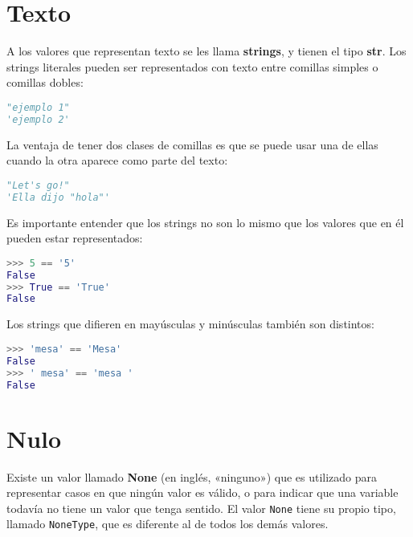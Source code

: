 \section{Texto}

A los valores que representan texto se les llama \textbf{strings}, y
tienen el tipo \textbf{str}.
Los strings literales pueden ser representados con texto entre comillas
simples o comillas dobles:

\begin{lstlisting}[language=py]
"ejemplo 1"
'ejemplo 2'
\end{lstlisting}

La ventaja de tener dos clases de comillas es que se puede usar una de
ellas cuando la otra aparece como parte del texto:

\begin{lstlisting}[language=py]
"Let's go!"
'Ella dijo "hola"'
\end{lstlisting}

Es importante entender que los strings no son lo mismo que los valores
que en él pueden estar representados:

\begin{lstlisting}[language=py]
>>> 5 == '5'
False
>>> True == 'True'
False
\end{lstlisting}

Los strings que difieren en mayúsculas y minúsculas
también son distintos:

\begin{lstlisting}[language=py]
>>> 'mesa' == 'Mesa'
False
>>> ' mesa' == 'mesa '
False
\end{lstlisting}

\section{Nulo}

Existe un valor llamado \textbf{None} (en inglés, «ninguno») que es
utilizado para representar casos en que ningún valor es válido, o para
indicar que una variable todavía no tiene un valor que tenga sentido.
El valor \lstinline!None! tiene su propio tipo, llamado
\lstinline!NoneType!, que es diferente al de todos los demás valores.
